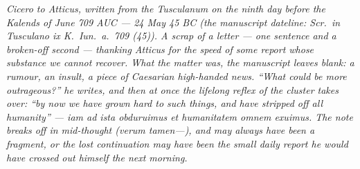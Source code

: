 
\textit{Cicero to Atticus, written from the
Tusculanum on the ninth day before the Kalends of
June 709 AUC --- 24 May 45 BC (the manuscript
dateline: \textit{Scr.\ in Tusculano ix K.\ Iun.\ a.\
709 (45)}). A scrap of a letter --- one sentence and
a broken-off second --- thanking Atticus for the speed
of some report whose substance we cannot recover.
What the matter was, the manuscript leaves blank: a
rumour, an insult, a piece of Caesarian high-handed
news. ``What could be more outrageous?'' he writes,
and then at once the lifelong reflex of the cluster
takes over: ``by now we have grown hard to such
things, and have stripped off all humanity'' ---
\textit{iam ad ista obduruimus et humanitatem omnem
exuimus}. The note breaks off in mid-thought
(\textit{verum tamen---}), and may always have been a
fragment, or the lost continuation may have been the
small daily report he would have crossed out himself
the next morning.}
